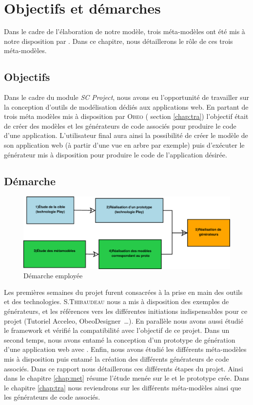 \chapter{Objectifs et démarches}\label{chap:mod}
Dans le cadre de l'élaboration de notre modèle, trois méta-modèles ont été mis à notre disposition par \kwobeo. Dans ce chapitre, nous détaillerons le rôle de ces trois méta-modèles.


\section{Objectifs}
Dans le cadre du module \emph{SC Project}, nous avons eu l'opportunité de travailler sur la conception d'outils de modélisation dédiés aux applications web. En partant de trois méta modèles mis à disposition par \textsc{Obeo}
(\cf{} section \ref{chap:tra}) l'objectif était de créer des modèles et les générateurs de code associés pour produire le code d'une application. L'utilisateur final aura ainsi la possibilité de créer le modèle de son application web (à partir d'une vue en arbre par exemple) puis d'exécuter le générateur mis à disposition pour produire le code de l'application désirée.



\section{Démarche} 
\begin{figure}[htb]
  \centering
  \includegraphics[scale=.4]{img/demarche.eps}
  \caption{Démarche employée}
  \label{fig:dem}
\end{figure}

Les premières semaines du projet furent consacrées à la prise en main des outils et des technologies. S.\textsc{Thibaudeau} nous a mis à disposition des exemples de générateurs, et les références vers les différentes initiations indispensables pour ce projet (Tutoriel Acceleo, ObeoDesigner~\dots). En parallèle nous avons aussi étudié le framework \kwplay{} et vérifié la compatibilité avec l'objectif de ce projet. Dans un second temps, nous avons entamé la conception d'un prototype de génération d'une application web avec \kwplay{}. Enfin, nous avons étudié les différents méta-modèles mis à disposition puis entamé la création des différents générateurs de code associés. Dans ce rapport nous détaillerons ces différents étapes du projet. Ainsi dans le chapitre \ref{chap:met} résume l'étude menée sur le \kwplay{} et le prototype crée. Dans le chapitre \ref{chap:tra} nous reviendrons sur les différents méta-modèles ainsi que les générateurs de code associés. 



